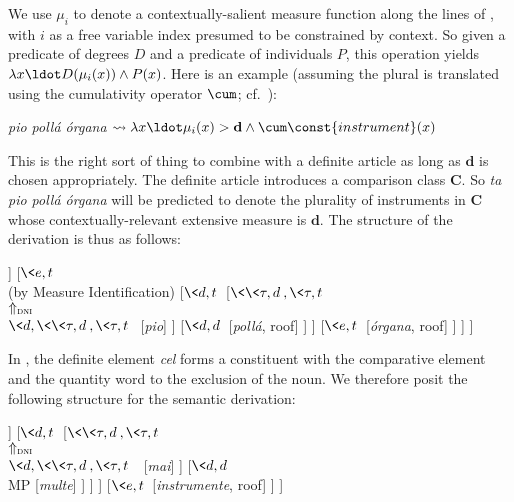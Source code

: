\documentclass[output=paper
,modfonts
,nonflat]{langsci/langscibook}
\begin{document}
We use $\mu_i$ to denote a contextually-salient measure function along the lines of \citet{Wellwood2014}, with $i$ as a free variable index presumed to be constrained by context. So given a predicate of degrees $D$ and a predicate of individuals $P$, this operation yields $\lambda x \ldot D(\mu_i(x)) \land P(x)$. 
Here is an example (assuming the plural is translated using the cumulativity operator $\cum$; cf.\ \citealt{Link1983}):

\ea \label{ex:coppockstrand:99}
\textit{pio pollá órgana} $\leadsto \lambda x \ldot \mu_i(x) > \textbf{d} \land \cum\const{instrument}(x)$ 
\z 

This is the right sort of thing to combine with a definite article as long as $\textbf{d}$ is chosen appropriately. The definite article introduces a comparison class $\textbf{C}$. So \textit{ta pio pollá órgana} will be predicted to denote the plurality of instruments in $\textbf{C}$ whose contextually-relevant extensive measure is $\textbf{d}$. The structure of the derivation is thus as follows:\newpage

\ea \label{ex:coppockstrand:100}
\begin{forest}
	[{$e$}
		[{$\<\<\tau,t\>,\tau\>$} [\textit{i}]
		]
		[{$\<e,t\>$\\(by Measure Identification)}
			[{$\<d,t\>$}
				[{$\<\<\tau,d\>,\<\tau,t\>\>$\\$\Uparrow_{\textsc{dni}}$\\$\<d,\<\<\tau,d\>,\<\tau,t\>\>$} [\textit{pio}]
				]
				[{$\<d,d\>$} [\textit{poll\'a}, roof]
				]
			]		
			[{$\<e,t\>$} [\textit{\'organa}, roof]
			]
		]
	]
\end{forest}
\z 


In , the definite element \textit{cel} forms a constituent with the comparative element and the quantity word to the exclusion of the noun. We therefore posit the following structure for the semantic derivation:

\ea \label{ex:coppockstrand:101}
\begin{forest}
	[{$\<e,t\>$\\(by Measure Identification)}
		[{$\<d,t\>$}
			[{$\<\<\tau,t\>,\<\tau,t\>\>$} [\textit{cele}]
			]
			[{$\<d,t\>$}
				[{$\<\<\tau,d\>,\<\tau,t\>\>$\\$\Uparrow_{\textsc{dni}}$\\$\<d,\<\<\tau,d\>,\<\tau,t\>\>\>$} [\textit{mai}]
				]
				[{$\<d,d\>$\\MP} [\textit{multe}]
				]
			]
		]
		[{$\<e,t\>$} [\textit{instrumente}, roof]
		]
	]
\end{forest}
\z 
\end{document}
